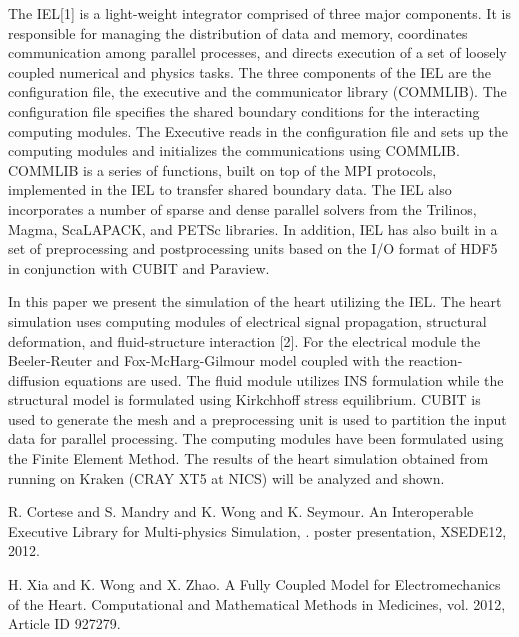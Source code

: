 \documentclass[article,A4,11pt]{llncs}%
\begin{document}
The IEL[1] is a light-weight integrator comprised of three major components.  It is responsible for managing the distribution of data and memory, coordinates communication among parallel processes, and directs execution of a set of loosely coupled numerical and physics tasks. The three components of the IEL are the configuration file, the executive and the communicator library (COMMLIB). The configuration file specifies the shared boundary conditions for the interacting computing modules. The Executive reads in the configuration file and sets up the computing modules and initializes the communications using COMMLIB. COMMLIB is a series of functions, built on top of the MPI protocols, implemented in the IEL to transfer shared boundary data. The IEL also incorporates a number of sparse and dense parallel solvers from the Trilinos, Magma, ScaLAPACK, and PETSc libraries. In addition, IEL has also built in a set of preprocessing and postprocessing units based on the I/O format of HDF5 in conjunction with CUBIT and Paraview. 
 
In this paper we present the simulation of the heart utilizing the IEL. The heart simulation uses computing modules of electrical signal propagation, structural deformation, and fluid-structure interaction [2]. For the electrical module the Beeler-Reuter and Fox-McHarg-Gilmour model coupled with the reaction-diffusion equations are used. The fluid module utilizes INS formulation while the structural model is formulated using Kirkchhoff stress equilibrium. CUBIT is used to generate the mesh and a preprocessing unit is used to partition the input data for parallel processing. The computing modules have been formulated using the Finite Element Method. The results of the heart simulation obtained from running on Kraken (CRAY XT5 at NICS) will be analyzed and shown.



\begin{thebibliography}{10}
{\sc R. Cortese and S. Mandry and K. Wong and K. Seymour}. {An Interoperable Executive Library for Multi-physics Simulation, }. poster presentation, XSEDE12, 2012.

{\sc H. Xia and K. Wong and X. Zhao}. {A Fully Coupled Model for Electromechanics of the Heart}. Computational and Mathematical Methods in Medicines, vol. 2012, Article ID 927279.
\end{thebibliography}
\end{document}

